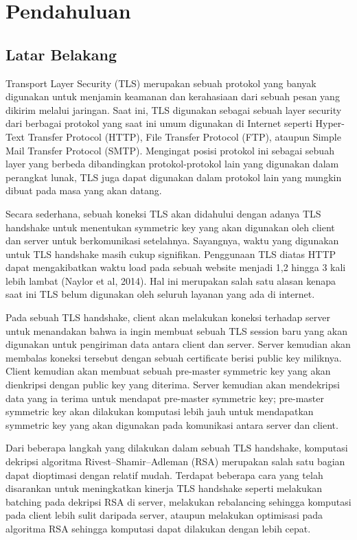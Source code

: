 \chapter{Pendahuluan}


\section{Latar Belakang}

Transport Layer Security (TLS) merupakan sebuah protokol yang banyak digunakan untuk menjamin keamanan dan kerahasiaan dari sebuah pesan yang dikirim melalui jaringan. Saat ini, TLS digunakan sebagai sebuah layer security dari berbagai protokol yang saat ini umum digunakan di Internet seperti Hyper-Text Transfer Protocol (HTTP), File Transfer Protocol (FTP), ataupun Simple Mail Transfer Protocol (SMTP). Mengingat posisi protokol ini sebagai sebuah layer yang berbeda dibandingkan protokol-protokol lain yang digunakan dalam perangkat lunak, TLS juga dapat digunakan dalam protokol lain yang mungkin dibuat pada masa yang akan datang.

Secara sederhana, sebuah koneksi TLS akan didahului dengan adanya TLS handshake untuk menentukan symmetric key yang akan digunakan oleh client dan server untuk berkomunikasi setelahnya. Sayangnya, waktu yang digunakan untuk TLS handshake masih cukup signifikan. Penggunaan TLS diatas HTTP dapat mengakibatkan waktu load pada sebuah website menjadi 1,2 hingga 3 kali lebih lambat (Naylor et al, 2014). Hal ini merupakan salah satu alasan kenapa saat ini TLS belum digunakan oleh seluruh layanan yang ada di internet.

Pada sebuah TLS handshake, client akan melakukan koneksi terhadap server untuk menandakan bahwa ia ingin membuat sebuah TLS session baru yang akan digunakan untuk pengiriman data antara client dan server. Server kemudian akan membalas koneksi tersebut dengan sebuah certificate berisi public key miliknya. Client kemudian akan membuat sebuah pre-master symmetric key yang akan dienkripsi dengan public key yang diterima. Server kemudian akan mendekripsi data yang ia terima untuk mendapat pre-master symmetric key; pre-master symmetric key akan dilakukan komputasi lebih jauh untuk mendapatkan symmetric key yang akan digunakan pada komunikasi antara server dan client.

Dari beberapa langkah yang dilakukan dalam sebuah TLS handshake, komputasi dekripsi algoritma Rivest–Shamir–Adleman (RSA) merupakan salah satu bagian dapat dioptimasi dengan relatif mudah.  Terdapat beberapa cara yang telah disarankan untuk meningkatkan kinerja TLS handshake seperti melakukan batching pada dekripsi RSA di server, melakukan rebalancing sehingga komputasi pada client lebih sulit daripada server, ataupun melakukan optimisasi pada algoritma RSA sehingga komputasi dapat dilakukan dengan lebih cepat.

